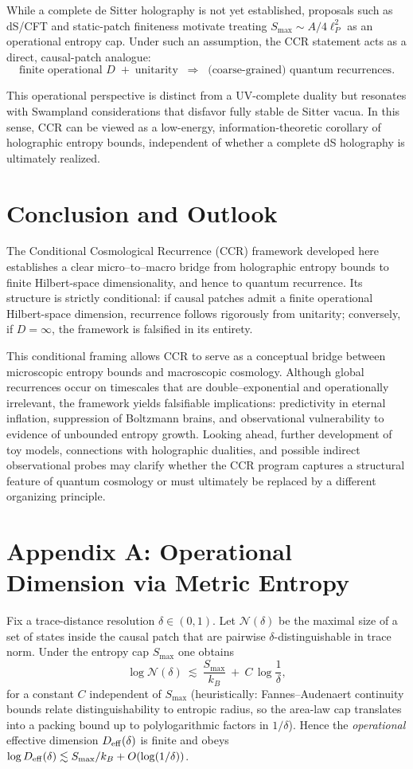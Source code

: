 \documentclass[12pt]{article}
\newcommand{\Smax}{S_{\max}}
\theoremstyle{remark}
\begin{document}
While a complete de Sitter holography is not yet established, proposals such as 
dS/CFT and static-patch finiteness motivate treating 
$\Smax \sim A/4\ell_P^2$ as an operational entropy cap. 
Under such an assumption, the CCR statement acts as a direct, causal-patch 
analogue: 
\[
\text{finite operational } D \; + \; \text{unitarity} 
\;\;\Rightarrow\;\; \text{(coarse-grained) quantum recurrences}.
\]

This operational perspective is distinct from a UV-complete duality but 
resonates with Swampland considerations that disfavor fully stable de Sitter vacua. 
In this sense, CCR can be viewed as a low-energy, information-theoretic corollary 
of holographic entropy bounds, independent of whether a complete dS holography 
is ultimately realized.


\section{Conclusion and Outlook}

The Conditional Cosmological Recurrence (CCR) framework developed here
establishes a clear micro--to--macro bridge from holographic entropy
bounds to finite Hilbert-space dimensionality, and hence to quantum
recurrence. Its structure is strictly conditional: if causal patches admit
a finite operational Hilbert-space dimension, recurrence follows rigorously
from unitarity; conversely, if $D=\infty$, the framework is falsified in
its entirety. 

This conditional framing allows CCR to serve as a conceptual bridge
between microscopic entropy bounds and macroscopic cosmology.
Although global recurrences occur on timescales that are double--exponential
and operationally irrelevant, the framework yields falsifiable implications:
predictivity in eternal inflation, suppression of Boltzmann brains, and
observational vulnerability to evidence of unbounded entropy growth.
Looking ahead, further development of toy models, connections with
holographic dualities, and possible indirect observational probes may
clarify whether the CCR program captures a structural feature of quantum
cosmology or must ultimately be replaced by a different organizing principle.



\appendix
\section*{Appendix A: Operational Dimension via Metric Entropy}
Fix a trace-distance resolution $\delta\in(0,1)$. Let $\mathcal{N}(\delta)$ be the maximal size of a set of states inside the causal patch that are pairwise $\delta$-distinguishable in trace norm. Under the entropy cap $\Smax$ one obtains
\[
\log \mathcal{N}(\delta)\ \lesssim\ \frac{\Smax}{k_B}\ +\ C\,\log\!\frac{1}{\delta},
\]
for a constant $C$ independent of $\Smax$ (heuristically: Fannes--Audenaert continuity bounds relate distinguishability to entropic radius, so the area-law cap translates into a packing bound up to polylogarithmic factors in $1/\delta$). Hence the \emph{operational} effective dimension $D_{\rm eff}(\delta)$ is finite and obeys $\log D_{\rm eff}(\delta)\lesssim \Smax/k_B+O(\log(1/\delta))$.
\end{document}
